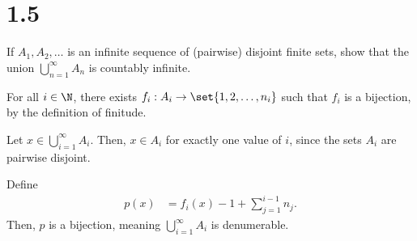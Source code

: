 \documentclass[11pt]{mypackage}
\begin{document}
\section{1.5}%
\begin{problem}
  If $A_1,A_2,\dots$ is an infinite sequence of (pairwise) disjoint finite sets, show that the union $\bigcup_{n=1}^{\infty}A_n$ is countably infinite.
\end{problem}
\begin{solution}
  For all $i\in \N$, there exists $f_i: A_i\rightarrow \set{1,2,\dots,n_i}$ such that $f_i$ is a bijection, by the definition of finitude.\newline

  Let $x\in \bigcup_{i=1}^{\infty}A_i$. Then, $x\in A_i$ for exactly one value of $i$, since the sets $A_i$ are pairwise disjoint.\newline

  Define
  \begin{align*}
    p(x) &= f_i(x) - 1 + \sum_{j=1}^{i-1}n_j.
  \end{align*}
  Then, $p$ is a bijection, meaning $\bigcup_{i=1}^{\infty}A_i$ is denumerable.
%
\end{solution}
%
%
%
\end{document}
